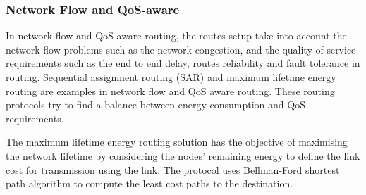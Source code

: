 
\subsubsection{Network Flow and QoS-aware}
In network flow and QoS aware routing, the routes setup take into account the network flow problems such as the network congestion, and the quality of service requirements such as the end to end delay, routes reliability and fault tolerance in routing. Sequential assignment routing (SAR) \cite{sar} and maximum lifetime energy routing \cite{maxlifetimechang} are examples in network flow and QoS aware routing. These routing protocols try to find a balance between energy consumption and QoS requirements.


The maximum lifetime energy routing solution has the objective of maximising the network lifetime by considering the nodes' remaining energy to define the link cost for transmission using the link. The protocol uses Bellman-Ford shortest path algorithm to compute the least cost paths to the destination. 



